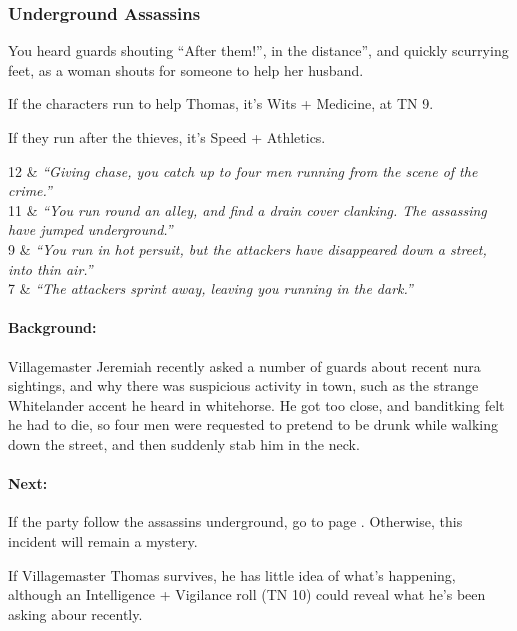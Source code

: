 \subsubsection{Underground Assassins}

\begin{boxtext}
	You heard guards shouting ``After them!'', in the distance'', and quickly scurrying feet, as a woman shouts for someone to help her husband.
\end{boxtext}

If the characters run to help Thomas, it's Wits + Medicine, at TN 9.

If they run after the thieves, it's Speed + Athletics.

\begin{tcolorbox}[tabularx={cX},arc=1mm]

	12 & \textit{``Giving chase, you catch up to four men running from the scene of the crime.''} \\
	11 & \textit{``You run round an alley, and find a drain cover clanking. The assassing have jumped underground.''} \\
	9 & \textit{``You run in hot persuit, but the attackers have disappeared down a street, into thin air.''} \\
	7 & \textit{``The attackers sprint away, leaving you running in the dark.''} \\

\end{tcolorbox}

\paragraph{Background:} Villagemaster Jeremiah recently asked a number of guards about recent nura sightings, and why there was suspicious activity in town, such as the strange Whitelander accent he heard in \gls{whitehorse}.  He got too close, and \gls{banditking} felt he had to die, so four men were requested to pretend to be drunk while walking down the street, and then suddenly stab him in the neck.

\paragraph{Next:} If the party follow the assassins underground, go to page \pageref{sewers}.  Otherwise, this incident will remain a mystery.

If Villagemaster Thomas survives, he has little idea of what's happening, although an Intelligence + Vigilance roll (TN 10) could reveal what he's been asking abour recently.



